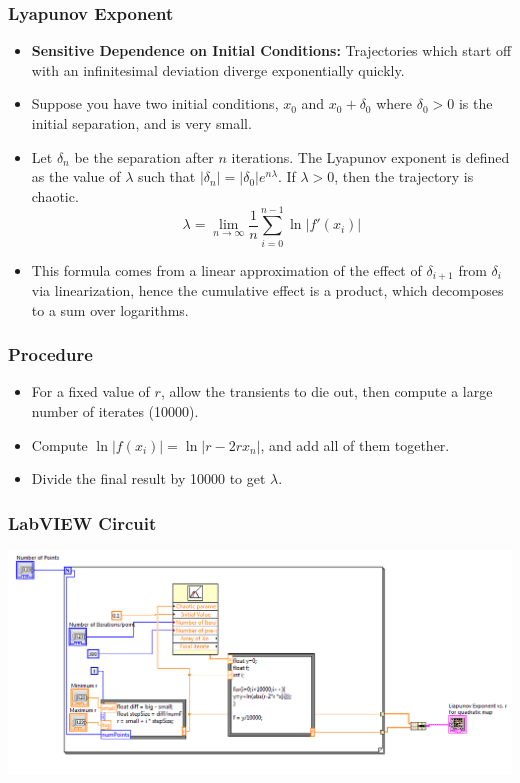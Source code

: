 \documentclass[9pt]{beamer}
\begin{document}
\begin{frame}

\frametitle{Lyapunov Exponent}
	\begin{itemize}
		\item \textbf{Sensitive Dependence on Initial Conditions:}    
			Trajectories which start off with an infinitesimal deviation 
			diverge exponentially quickly.  
		\item Suppose you have two initial conditions, \( x_0 \) and \( x_0 +
			\delta_0 \) where \( \delta_0 > 0 \) is the initial separation, and is very small. 
		\item Let \( \delta_n \) be the separation after \( n \) iterations. The
			Lyapunov exponent is defined as the value of \( \lambda \) such that 
			\( |\delta_n| = |\delta_0| e^{n \lambda} \). If \( \lambda > 0 \), then
			the trajectory is chaotic.
			\[
				\lambda = \lim_{n \to \infty}\frac{1}{n} \sum_{i = 0}^{n - 1} \ln |f'(x_i)|
			\]
		\item This formula comes from a linear approximation of the effect of \(
			\delta_{i+1} \) from \( \delta_{i} \) via linearization, hence the
			cumulative effect is a product, which decomposes to a sum over
			logarithms. 
	\end{itemize}
\end{frame}

\begin{frame}
	\frametitle{Procedure}
	\begin{itemize}
		\item For a fixed value of \( r \), allow the transients to die out, then
			compute a large number of iterates (10000).   
		\item Compute \( \ln |f(x_i)| = \ln |r - 2rx_n| \), and add all of them
			together. 
		\item Divide the final result by 10000 to get \( \lambda \).  
	\end{itemize}
\end{frame}

\begin{frame}
	\frametitle{LabVIEW Circuit}

	\begin{center}
		\includegraphics[scale=0.35]{images/LiapunovBlockDiagram}
	\end{center}
\end{frame}
\end{document}
